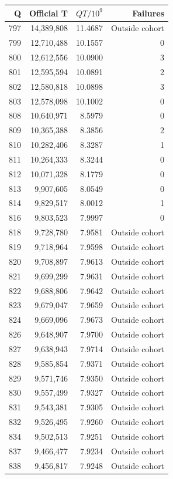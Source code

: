 \begin{tabular}{rrrr}
\toprule
Q & Official T & $QT/10^9$ & Failures \\
\midrule
797 & 14,389,808 & 11.4687 & Outside cohort \\
799 & 12,710,488 & 10.1557 & 0 \\
800 & 12,612,556 & 10.0900 & 3 \\
801 & 12,595,594 & 10.0891 & 2 \\
802 & 12,580,818 & 10.0898 & 3 \\
803 & 12,578,098 & 10.1002 & 0 \\
808 & 10,640,971 & 8.5979 & 0 \\
809 & 10,365,388 & 8.3856 & 2 \\
810 & 10,282,406 & 8.3287 & 1 \\
811 & 10,264,333 & 8.3244 & 0 \\
812 & 10,071,328 & 8.1779 & 0 \\
813 & 9,907,605 & 8.0549 & 0 \\
814 & 9,829,517 & 8.0012 & 1 \\
816 & 9,803,523 & 7.9997 & 0 \\
818 & 9,728,780 & 7.9581 & Outside cohort \\
819 & 9,718,964 & 7.9598 & Outside cohort \\
820 & 9,708,897 & 7.9613 & Outside cohort \\
821 & 9,699,299 & 7.9631 & Outside cohort \\
822 & 9,688,806 & 7.9642 & Outside cohort \\
823 & 9,679,047 & 7.9659 & Outside cohort \\
824 & 9,669,096 & 7.9673 & Outside cohort \\
826 & 9,648,907 & 7.9700 & Outside cohort \\
827 & 9,638,943 & 7.9714 & Outside cohort \\
828 & 9,585,854 & 7.9371 & Outside cohort \\
829 & 9,571,746 & 7.9350 & Outside cohort \\
830 & 9,557,499 & 7.9327 & Outside cohort \\
831 & 9,543,381 & 7.9305 & Outside cohort \\
832 & 9,526,495 & 7.9260 & Outside cohort \\
834 & 9,502,513 & 7.9251 & Outside cohort \\
837 & 9,466,477 & 7.9234 & Outside cohort \\
838 & 9,456,817 & 7.9248 & Outside cohort \\

\end{tabular}
